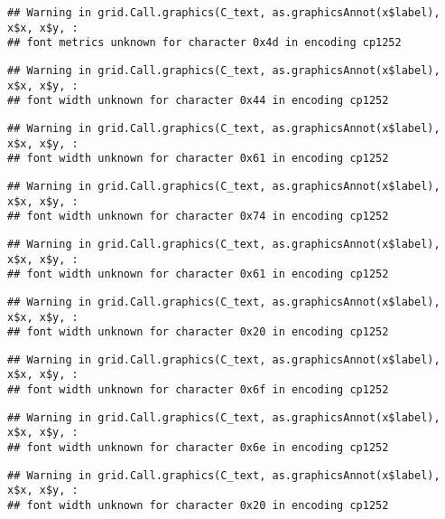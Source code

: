 \documentclass[
]{article}
\begin{document}
\begin{verbatim}
## Warning in grid.Call.graphics(C_text, as.graphicsAnnot(x$label), x$x, x$y, :
## font metrics unknown for character 0x4d in encoding cp1252
\end{verbatim}

\begin{verbatim}
## Warning in grid.Call.graphics(C_text, as.graphicsAnnot(x$label), x$x, x$y, :
## font width unknown for character 0x44 in encoding cp1252
\end{verbatim}

\begin{verbatim}
## Warning in grid.Call.graphics(C_text, as.graphicsAnnot(x$label), x$x, x$y, :
## font width unknown for character 0x61 in encoding cp1252
\end{verbatim}

\begin{verbatim}
## Warning in grid.Call.graphics(C_text, as.graphicsAnnot(x$label), x$x, x$y, :
## font width unknown for character 0x74 in encoding cp1252
\end{verbatim}

\begin{verbatim}
## Warning in grid.Call.graphics(C_text, as.graphicsAnnot(x$label), x$x, x$y, :
## font width unknown for character 0x61 in encoding cp1252
\end{verbatim}

\begin{verbatim}
## Warning in grid.Call.graphics(C_text, as.graphicsAnnot(x$label), x$x, x$y, :
## font width unknown for character 0x20 in encoding cp1252
\end{verbatim}

\begin{verbatim}
## Warning in grid.Call.graphics(C_text, as.graphicsAnnot(x$label), x$x, x$y, :
## font width unknown for character 0x6f in encoding cp1252
\end{verbatim}

\begin{verbatim}
## Warning in grid.Call.graphics(C_text, as.graphicsAnnot(x$label), x$x, x$y, :
## font width unknown for character 0x6e in encoding cp1252
\end{verbatim}

\begin{verbatim}
## Warning in grid.Call.graphics(C_text, as.graphicsAnnot(x$label), x$x, x$y, :
## font width unknown for character 0x20 in encoding cp1252
\end{verbatim}
\end{document}
